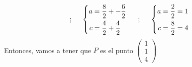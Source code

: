 \documentclass{article}
\begin{document}
\begin{enumerate}
\[            \text{;}
            \hspace{0.5cm}
            \left\{
                \begin{aligned}
                    a &= \frac{8}{2} + -\frac{6}{2} \\
                    c &= \frac{4}{2} + \frac{4}{2}
                \end{aligned}
            \right.
            \hspace{0.5cm}
            \text{;}
            \hspace{0.5cm}
            \left\{
                \begin{aligned}
                    a &= \frac{2}{2} = 1 \\
                    c &= \frac{8}{2} = 4
                \end{aligned}
            \right.
        \]
        Entonces, vamos a tener que \(P\) es el punto 
        \(
            \begin{pmatrix}
                1 \\ 1 \\ 4
            \end{pmatrix}
        \)


\end{enumerate}
\end{document}
